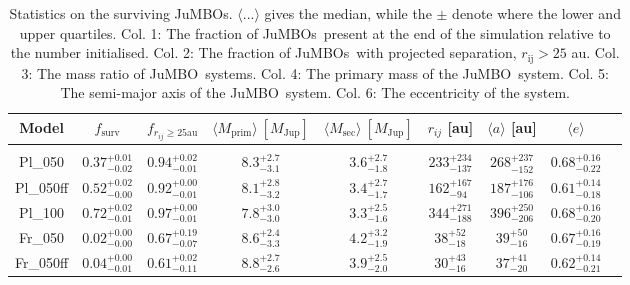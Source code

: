 \documentclass[submission,phys]{lib/SciPost}
\newcommand{\jumbo}{\mbox{JuMBO}}
\newcommand{\jumbos}{\mbox{JuMBOs}}
\begin{document}
\begin{table}
         \caption{Statistics on the surviving \jumbos. $\langle
           ...\rangle$ gives the median, while the $\pm$ denote where
           the lower and upper quartiles. Col. 1: The fraction of
           \jumbos\, present at the end of the simulation relative to
           the number initialised. Col. 2: The fraction of \jumbos\,
           with projected separation, $r_{\mathrm{ij}} > 25$
           au. Col. 3: The mass ratio of \jumbo\, systems. Col. 4: The
           primary mass of the \jumbo\, system. Col. 5: The semi-major
           axis of the \jumbo\, system. Col. 6: The eccentricity of
           the system.}
        \label{Tab:SF_Res}
        \centering 
        \begin{tabular}{c c c c c c c c c}
        \hline\hline
        Model & $f_{\mathrm{surv}}$ & $f_{r_{ij} \geq 25\mathrm{ au}}$ & $\langle M_{\mathrm{prim}} \rangle\ [M_{\mathrm{Jup}}]$ & $\langle M_{\mathrm{sec}} \rangle\ [M_{\mathrm{Jup}}]$ & $r_{ij}$ [au] &$\langle a \rangle$ [au] & $\langle e \rangle$\\
        \hline \vspace{-0.75em}\\ 
           Pl\_050     & $0.37^{+0.01}_{-0.02}$ & $0.94^{+0.02}_{-0.01}$ & $8.3^{+2.7}_{-3.1}$ & $3.6^{+2.7}_{-1.8}$ & $233^{+234}_{-137}$ & $268^{+237}_{-152}$ & $0.68^{+0.16}_{-0.22}$ \vspace{0.25em}\\
           Pl\_050ff   & $0.52^{+0.02}_{-0.00}$ & $0.92^{+0.00}_{-0.01}$ & $8.1^{+2.8}_{-3.2}$ & $3.4^{+2.7}_{-1.7}$ & $162^{+167}_{-94}$ & $187^{+176}_{-106}$ & $0.61^{+0.14}_{-0.18}$ \vspace{0.25em}\\
           Pl\_100      & $0.72^{+0.02}_{-0.01}$ & $0.97^{+0.00}_{-0.01}$ & $7.8^{+3.0}_{-3.0}$ & $3.3^{+2.5}_{-1.6}$ & $344^{+271}_{-188}$ & $396^{+250}_{-206}$ & $0.68^{+0.16}_{-0.20}$ \vspace{0.25em}\\
           Fr\_050     & $0.02^{+0.00}_{-0.00}$ & $0.67^{+0.19}_{-0.07}$ & $8.6^{+2.4}_{-3.3}$ & $4.2^{+3.2}_{-1.9}$ & $38^{+52}_{-18}$ & $39^{+50}_{-16}$ & $0.67^{+0.16}_{-0.19}$ \vspace{0.25em}\\
           Fr\_050ff   & $0.04^{+0.00}_{-0.01}$ & $0.61^{+0.02}_{-0.11}$ & $8.8^{+2.7}_{-2.6}$ & $3.9^{+2.5}_{-2.0}$ & $30^{+43}_{-16}$ & $37^{+41}_{-20}$ & $0.62^{+0.14}_{-0.21}$ \vspace{0.25em}\\

\end{tabular}
\end{table}
\end{document}
